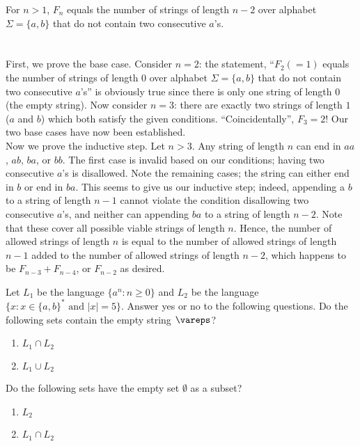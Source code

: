 \documentclass[solution, letterpaper]{cs121}
\begin{document}
\subproblem For $n > 1$, $F_n$ equals the number of strings of length $n-2$ over alphabet $\Sigma = \{a, b\}$ that do not contain two consecutive $a$'s.
\\\\
\\\indent First, we prove the base case.  Consider $n = 2$: the statement, ``$F_{2} (= 1)$ equals the number of strings of length $0$ over alphabet $\Sigma = \{a, b\}$ that do not contain two consecutive $a$'s'' is obviously true since there is only one string of length $0$ (the empty string).  Now consider $n = 3$: there are exactly two strings of length $1$ ($a$ and $b$) which both satisfy the given conditions.  ``Coincidentally'', $F_{3} = 2$!  Our two base cases have now been established.
\\\indent Now we prove the inductive step.  Let $n > 3$.  Any string of length $n$ can end in $aa$, $ab$, $ba$, or $bb$.  The first case is invalid based on our conditions; having two consecutive $a$'s is disallowed.  Note the remaining cases; the string can either end in $b$ or end in $ba$.  This seems to give us our inductive step; indeed, appending a $b$ to a string of length $n-1$ cannot violate the condition disallowing two consecutive $a$'s, and neither can appending $ba$ to a string of length $n-2$.  Note that these cover all possible viable strings of length $n$.  Hence, the number of allowed strings of length $n$ is equal to the number of allowed strings of length $n-1$ added to the number of allowed strings of length $n-2$, which happens to be $F_{n-3} + F_{n-4}$, or $F_{n-2}$ as desired.
 
Let $L_1$ be the language $\{ a^n : n \ge 0\}$ and $L_2$ be the language $\{x : x \in \{a, b\}^* \text{ and } |x| = 5\}$. Answer yes or no to the following questions.
\subproblem Do the following sets contain the empty string $\vareps$?
\begin{enumerate}
\item $L_1 \cap L_2$
\item $L_1 \cup L_2$
\end{enumerate}

\subproblem Do the following sets have the empty set $\emptyset$ as a subset?
\begin{enumerate}
\item $L_2$
\item $L_1 \cap L_2$
\end{enumerate}
\end{document}
